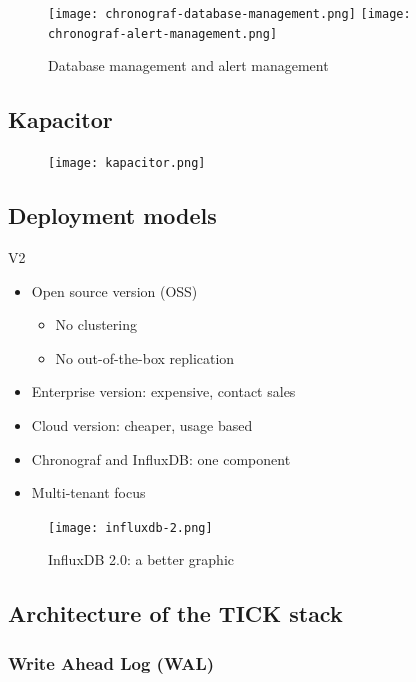 \documentclass{article}
\begin{document}
\begin{figure}[H]
    \centering
    \texttt{[image: chronograf-database-management.png]}
    \texttt{[image: chronograf-alert-management.png]}
    \caption{Database management and alert management}
\end{figure}

\subsection{Kapacitor}

\begin{figure}[H]
    \centering
    \texttt{[image: kapacitor.png]}
    \caption{}
\end{figure}

\subsection{Deployment models}

V2

\begin{itemize}
    \item Open source version (OSS)
    \begin{itemize}
        \item No clustering
        \item No out-of-the-box replication
    \end{itemize}
    \item Enterprise version: expensive, contact sales
    \item Cloud version: cheaper, usage based
    \item Chronograf and InfluxDB: one component
    \item Multi-tenant focus
\end{itemize}

\begin{figure}[H]
    \centering
    \texttt{[image: influxdb-2.png]}
    \caption{InfluxDB 2.0: a better graphic}
\end{figure}

\subsection{Architecture of the TICK stack}

\subsubsection{Write Ahead Log (WAL)}
\end{document}
